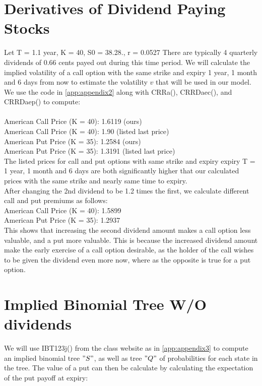 \documentclass{article}
\begin{document}
\section{Derivatives of Dividend Paying Stocks}
\hspace*{0.5cm}Let T = 1.1 year, K = 40, S0 = 38.28., r = 0.0527 There are typically 4 quarterly dividends of 0.66 cents payed out during this time period. We will calculate the implied volatility of a call option with the same strike and expiry 1 year, 1 month and 6 days from now to estimate the volatility $v$ that will be used in our model. We use the code in \ref{app:appendix2} along with CRRa(), CRRDaec(), and CRRDaep() to compute:
\\
\\
American Call Price (K = 40): 1.6119 (ours)\\
American Call Price (K = 40): 1.90 (listed last price)\\
American Put Price (K = 35):  1.2584 (ours)\\
American Put Price (K = 35):  1.3191 (listed last price)\\

The listed prices for call and put options with same strike and expiry expiry T = 1 year, 1 month and 6 days are both significantly higher that our calculated prices with the same strike and nearly same time to expiry.
\\
After changing the 2nd dividend to be 1.2 times the first, we calculate different call and put premiums as follows:
\\
American Call Price (K = 40): 1.5899\\
American Put Price (K = 35):  1.2937 \\
\hspace*{0.5cm}This shows that increasing the second dividend amount makes a call option less valuable, and a put more valuable. This is because the increased dividend amount make the early exercise of a call option desirable, as the holder of the call wishes to be given the dividend even more now, where as the opposite is true for a put option.

\section{Implied Binomial Tree W/O dividends}
\hspace*{0.5cm}We will use IBT123j() from the class website as in \ref{app:appendix3} to compute an implied binomial tree $"S"$, as well as tree $"Q"$ of probabilities for each state in the tree. The value of a put can then be calculate by calculating the expectation of the put payoff at expiry:
\end{document}
